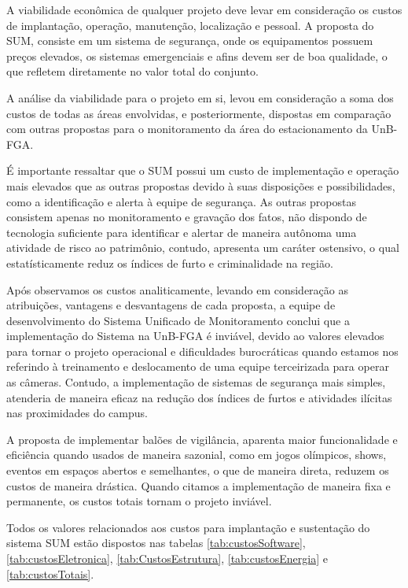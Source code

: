 
A viabilidade econômica de qualquer projeto deve levar em consideração os custos de implantação, operação, manutenção, localização e pessoal. A proposta do SUM, consiste em um sistema de segurança, onde os equipamentos possuem preços elevados, os sistemas emergenciais e afins devem ser de boa qualidade, o que refletem diretamente no valor total do conjunto.

A análise da viabilidade para o projeto em si, levou em consideração a soma dos custos de todas as áreas envolvidas, e posteriormente, dispostas em comparação com outras propostas para o monitoramento da área do estacionamento da UnB-FGA.

É importante ressaltar que o SUM possui um custo de implementação e operação mais elevados que as outras propostas devido à suas disposições e possibilidades, como a identificação e alerta à equipe de segurança. As outras propostas consistem apenas no monitoramento e gravação dos fatos, não dispondo de tecnologia suficiente para identificar e alertar de maneira autônoma uma atividade de risco ao patrimônio, contudo, apresenta um caráter ostensivo, o qual estatísticamente reduz os índices de furto e criminalidade na região.

Após observamos os custos analiticamente, levando em consideração as atribuições, vantagens e desvantagens de cada proposta, a equipe de desenvolvimento do Sistema Unificado de Monitoramento conclui que a implementação do Sistema na UnB-FGA é inviável, devido ao valores elevados para tornar o projeto operacional e dificuldades burocráticas quando estamos nos referindo à treinamento e deslocamento de uma equipe terceirizada para operar as câmeras. Contudo, a implementação de sistemas de segurança mais simples, atenderia de maneira eficaz na redução dos índices de furtos e atividades ilícitas nas proximidades do campus.

A proposta de implementar balões de vigilância, aparenta maior funcionalidade e eficiência quando usados de maneira sazonial, como em jogos olímpicos, shows, eventos em espaços abertos e semelhantes, o que de maneira direta, reduzem os custos de maneira drástica. Quando citamos a implementação de maneira fixa e permanente, os custos totais tornam o projeto inviável.

Todos os valores relacionados aos custos para implantação e sustentação do sistema SUM estão dispostos nas tabelas \ref{tab:custosSoftware}, \ref{tab:custosEletronica}, \ref{tab:CustosEstrutura}, \ref{tab:custosEnergia} e \ref{tab:custosTotais}.

